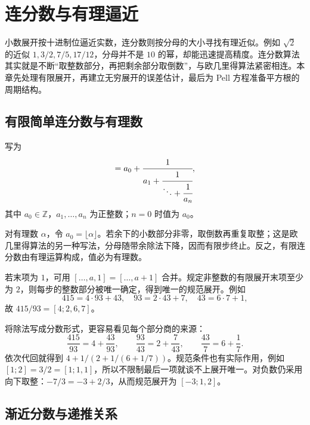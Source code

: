 \documentclass[UTF8,12pt,a4paper,fontset=fandol]{ctexbook}
\begin{document}
\chapter{连分数与有理逼近}
\label{ch:continued-fractions}

小数展开按十进制位逼近实数，连分数则按分母的大小寻找有理近似。例如 $\sqrt2$ 的近似 $1,3/2,7/5,17/12$，分母并不是 $10$ 的幂，却能迅速提高精度。连分数算法其实就是不断“取整数部分，再把剩余部分取倒数”，与欧几里得算法紧密相连。本章先处理有限展开，再建立无穷展开的误差估计，最后为 Pell 方程准备平方根的周期结构。

\section{有限简单连分数与有理数}

\begin{definition}
写为
\begin{equation}
 [a_0;a_1,\ldots,a_n]
 =a_0+\cfrac1{a_1+\cfrac1{\ddots+\cfrac1{a_n}}},
 \label{eq:finite-continued-fraction}
\end{equation}
其中 $a_0\in\mathbb Z$，$a_1,\ldots,a_n$ 为正整数；$n=0$ 时值为 $a_0$。
\end{definition}

对有理数 $\alpha$，令 $a_0=\lfloor\alpha\rfloor$。若余下的小数部分非零，取倒数再重复取整；这是欧几里得算法的另一种写法，分母随带余除法下降，因而有限步终止。反之，有限连分数由有理运算构成，值必为有理数。

若末项为 $1$，可用 $[\ldots,a,1]=[\ldots,a+1]$ 合并。规定非整数的有限展开末项至少为 $2$，则每步的整数部分被唯一确定，得到唯一的规范展开。例如
\[
 415=4\cdot93+43,\quad93=2\cdot43+7,\quad43=6\cdot7+1,
\]
故 $415/93=[4;2,6,7]$。

将除法写成分数形式，更容易看见每个部分商的来源：
\[
 \frac{415}{93}=4+\frac{43}{93},\qquad
 \frac{93}{43}=2+\frac7{43},\qquad
 \frac{43}{7}=6+\frac17.
\]
依次代回就得到 $4+1/(2+1/(6+1/7))$。规范条件也有实际作用，例如 $[1;2]=3/2=[1;1,1]$，所以不限制最后一项就谈不上展开唯一。对负数仍采用向下取整：$-7/3=-3+2/3$，从而规范展开为 $[-3;1,2]$。

\section{渐近分数与递推关系}
\end{document}
